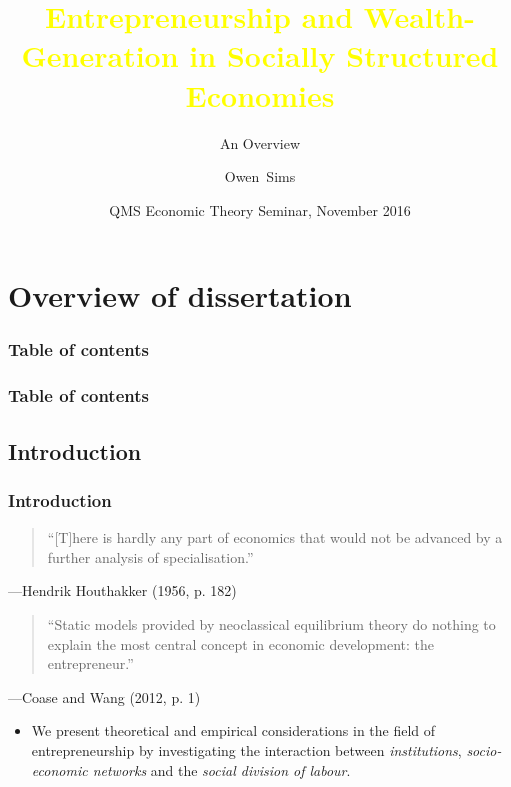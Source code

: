 \documentclass[10pt]{beamer}
\title[EntrepreneurshipSSE]{\textcolor{yellow}{Entrepreneurship and Wealth-Generation in Socially Structured Economies}}
\subtitle{An Overview}
\author[Sims]{Owen~Sims}
\institute[QUB]{Centre for Data Science and Scalable Computing\\ Queen's University Belfast}
\date[APR 2016]{QMS Economic Theory Seminar, November 2016}
\begin{document}
\begin{frame}
\titlepage
\end{frame}

\section{Overview of dissertation}

\begin{frame}
\frametitle{Table of contents}
\tableofcontents
\end{frame}

\begin{frame}
\frametitle{Table of contents}
\tableofcontents[currentsection]
\end{frame}

\subsection{Introduction}

\begin{frame} \frametitle{Introduction}
\begin{quotation}
``[T]here is hardly any part of economics that would not be advanced by a further analysis of specialisation.''
\end{quotation}
\begin{flushright}
---Hendrik Houthakker (1956, p. 182)
\end{flushright}
\begin{quotation}
``Static models provided by neoclassical equilibrium theory do nothing to explain the most central concept in economic development: the entrepreneur.''
\end{quotation}
\begin{flushright}
---Coase and Wang  (2012, p. 1)
\end{flushright}
\begin{itemize}
\medskip
\item We present theoretical and empirical considerations in the field of entrepreneurship by investigating the interaction between \emph{institutions}, \emph{socio-economic networks} and the \emph{social division of labour}.
\medskip
\end{itemize}
\end{frame}
\end{document}
